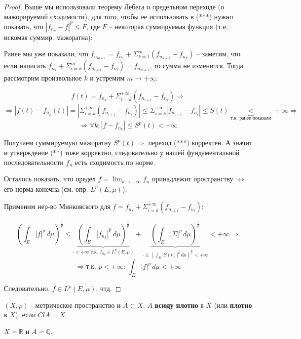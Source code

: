 \begin{proof}
    Выше мы использовали теорему Лебега о предельном переходе (о мажорируемой сходимости), для того, чтобы ее использовать в (***) нужно показать, что $|f_{n_k} - f|^p \leq F$, где $F$ -- некоторая суммируемая функция (т.е. искомая суммир. мажоратна):

    Ранее мы уже показали, что $f_{n_{m+1}} = f_{n_1} + \Sigma_{k=1}^{m} (f_{n_{k+1}} - f_{n_k})$ -- заметим, что если написать $f_{n_k} + \Sigma_{i=k}^{m} (f_{n_{i+1}} - f_{n_i}) = f_{n_{m+1}}$, то сумма не изменится. Тогда рассмотрим произвольное $k$ и устремим $m \rightarrow +\infty$:

    $$ f(t) = f_{n_k} + \Sigma_{i=k}^{+\infty} (f_{n_{i+1}} - f_{n_i}) \Rightarrow $$
    $$ \Rightarrow |f(t) - f_{n_k}(t)| = \left|\Sigma_{i=k}^{+\infty} (f_{n_{i+1}} - f_{n_i})\right| \leq \Sigma_{i=k}^{+\infty} |f_{n_{i+1}} - f_{n_i}| \leq S(t) \underbrace{<}_{\text{т.к. ранее показали}} +\infty \Rightarrow$$
    $$ \Rightarrow \forall k: |f - f_{n_k}| \leq S^p(t) < +\infty $$

    Получаем суммируемую мажоратну $S^p(t) \Rightarrow$ переход (***) корректен. А значит и утверждение (**) тоже корректно, следовательно у нашей фундаментальной последовательности $f_n$ есть сходимость по норме. \newline

    Осталось показать, что предел $f = \lim_{k\rightarrow +\infty} f_n$ принадлежит пространству $\Leftrightarrow$ его норма конечна (см. опр. $L^p (E, \mu)$):

    Применим нер-во Минковского для $f = f_{n_k} + \Sigma_{i=k}^{+\infty} (f_{n_{i+1}} - f_{n_i})$:

    $$ \left(\int_{E} |f|^p \, d\mu\right)^{\frac{1}{p}} \leq \underbrace{\left(\int_{E} |f_{n_k}|^p \, d\mu\right)^{\frac{1}{p}}}_{\cdot < +\infty \text{ т.к. $f_{n_k} \in L^p(E, \mu)$}} + \underbrace{\left(\int_{E} |\Sigma|^p \, d\mu\right)^{\frac{1}{p}}}_{\cdot \leq \left(\int_{E} |S(t)|^p \, d\mu\right)^{\frac{1}{p}} < +\infty} < +\infty \Rightarrow$$
    $$ \Rightarrow \text{т.к. $p < +\infty$: } \int_{E} |f|^p \, d\mu < +\infty $$

    Следовательно, $f \in L^p(E, \mu)$, чтд.
\end{proof}

\begin{definition}
    $(X, \rho)$ - метрическое пространство и $A \subset X$. $A$ \textbf{всюду плотно} в $X$ (или \textbf{плотно} в $X$), если $Cl A = X$.

    \begin{example}
        $X = \mathbb{R}$ и $A = \mathbb{Q}$.
    \end{example}
\end{definition}

